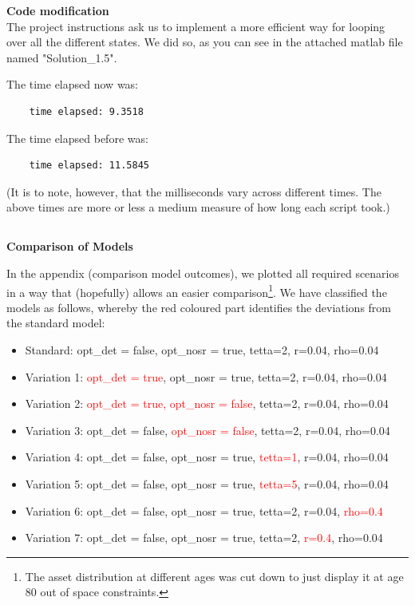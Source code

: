 \documentclass[12pt,a4paper]{article}
\begin{document}
\textbf{Code modification}\\
The project instructions ask us to implement a more efficient way for looping over all the different states. We did so, as you can see in the attached matlab file named "Solution\_1.5".

The time elapsed now was:

\begin{lstlisting}
    time elapsed: 9.3518
\end{lstlisting}

The time elapsed before was:

\begin{lstlisting}
    time elapsed: 11.5845
\end{lstlisting}

(It is to note, however, that the milliseconds vary across different times. The above times are more or less a medium measure of how long each script took.)

\subsection{}
\textbf{Comparison of Models}

In the appendix (comparison model outcomes), we plotted all required scenarios in a way that (hopefully) allows an easier comparison\footnote{The asset distribution at different ages was cut down to just display it at age 80 out of space constraints.}. We have classified the models as follows, whereby the red coloured part identifies the deviations from the standard model:

\begin{itemize}
    \item Standard: opt\_det = false, opt\_nosr = true, tetta=2, r=0.04, rho=0.04
    \item Variation 1: \textcolor{red}{opt\_det = true}, opt\_nosr = true, tetta=2, r=0.04, rho=0.04
    \item Variation 2: \textcolor{red}{opt\_det = true, opt\_nosr = false}, tetta=2, r=0.04, rho=0.04
    \item Variation 3: opt\_det = false, \textcolor{red}{opt\_nosr = false}, tetta=2, r=0.04, rho=0.04
    \item Variation 4: opt\_det = false, opt\_nosr = true, \textcolor{red}{tetta=1}, r=0.04, rho=0.04
    \item Variation 5: opt\_det = false, opt\_nosr = true, \textcolor{red}{tetta=5}, r=0.04, rho=0.04
    \item Variation 6: opt\_det = false, opt\_nosr = true, tetta=2, r=0.04, \textcolor{red}{rho=0.4}
    \item Variation 7: opt\_det = false, opt\_nosr = true, tetta=2, \textcolor{red}{r=0.4}, rho=0.04
\end{itemize}
\end{document}
